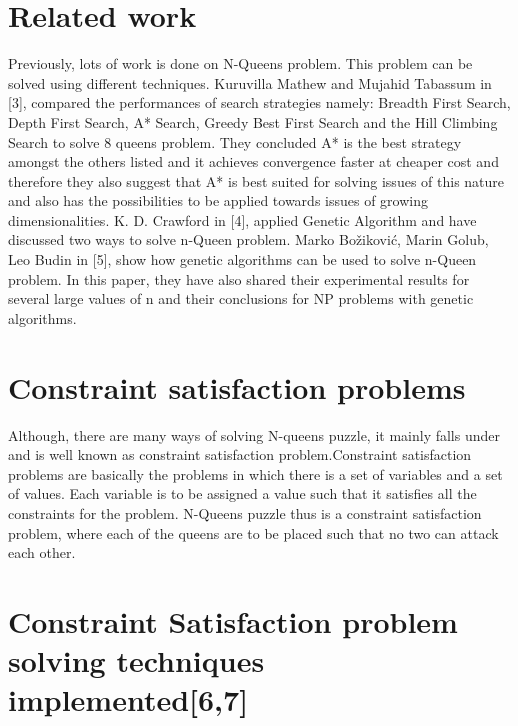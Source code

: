 \documentclass[conference]{IEEEtran}
\begin{document}
 




\section{Related work}
Previously,  lots  of  work  is  done  on  N-Queens  problem. This problem can be solved using different techniques. Kuruvilla Mathew and Mujahid Tabassum in [3], compared the performances of search strategies namely: Breadth  First  Search,  Depth First Search, A* Search, Greedy Best First Search and the  Hill  Climbing  Search to solve 8 queens problem. They concluded A* is the best strategy amongst the others listed and it achieves convergence faster at cheaper cost and therefore they also suggest that A* is  best  suited  for  solving  issues  of  this  nature and also  has  the possibilities  to  be  applied  towards  issues  of  growing dimensionalities.	 K.  D. Crawford  in  [4],  applied  Genetic  Algorithm  and  have discussed  two  ways  to  solve  n-Queen  problem. Marko Božiković, Marin Golub, Leo Budin in [5], show how genetic  algorithms can  be  used  to  solve  n-Queen  problem. In this paper, they have also shared their experimental results for several large values of n and their conclusions for NP problems with genetic algorithms.

\section{Constraint satisfaction problems}

Although, there are many ways of solving N-queens puzzle, it mainly falls under and is well known as  constraint satisfaction  problem.Constraint satisfaction problems are basically the problems in which there is a set of variables and a set of values. Each variable is to be assigned a value such that it satisfies all the constraints for the problem. N-Queens puzzle thus is a constraint satisfaction problem, where each of the queens are to be placed such that no two can attack each other.

\section{Constraint Satisfaction problem solving techniques implemented[6,7]}
\end{document}
